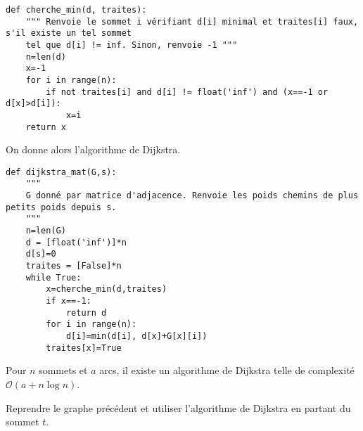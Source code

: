 \begin{lstlisting}
def cherche_min(d, traites):
    """ Renvoie le sommet i vérifiant d[i] minimal et traites[i] faux, s'il existe un tel sommet
    tel que d[i] != inf. Sinon, renvoie -1 """
    n=len(d)
    x=-1
    for i in range(n):
        if not traites[i] and d[i] != float('inf') and (x==-1 or d[x]>d[i]):
            x=i
    return x
\end{lstlisting}


On donne alors l'algorithme de Dijkstra.

\begin{lstlisting}
def dijkstra_mat(G,s):
    """ 
    G donné par matrice d'adjacence. Renvoie les poids chemins de plus petits poids depuis s. 
    """
    n=len(G)
    d = [float('inf')]*n
    d[s]=0
    traites = [False]*n
    while True:
        x=cherche_min(d,traites)
        if x==-1:
            return d
        for i in range(n):
            d[i]=min(d[i], d[x]+G[x][i])
        traites[x]=True
\end{lstlisting}

\begin{prop}
Pour $n$ sommets et $a$ arcs, il existe un algorithme de Dijkstra telle de complexité $\mathcal{O}\left(a+n\log n\right)$.
\end{prop}

\begin{exemple}
Reprendre le graphe précédent et utiliser l'algorithme de Dijkstra en partant du sommet $t$.
\end{exemple}

